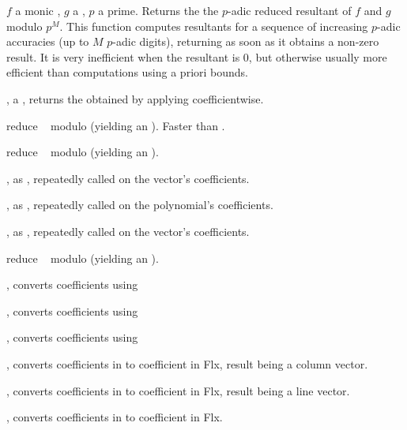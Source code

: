  $f$
a monic , $g$ a , $p$ a prime. Returns the
the $p$-adic reduced resultant of $f$ and $g$ modulo $p^M$. This function
computes resultants for a sequence of increasing $p$-adic accuracies
(up to $M$ $p$-adic digits), returning as soon as it obtains a non-zero
result. It is very inefficient when the resultant is $0$, but otherwise
usually more efficient than computations using a priori bounds.



,  a , returns the
 obtained by applying  coefficientwise.

 reduce ~ modulo 
(yielding an ). Faster than .

 reduce ~ modulo 
(yielding an ).

, as , repeatedly
called on the vector's coefficients.

, as ,
repeatedly called on the polynomial's coefficients.

, as ,
repeatedly called on the vector's coefficients.

 reduce ~ modulo 
(yielding an ).

, converts coefficients using 

, converts coefficients using 

, converts coefficients using 

, converts coefficients in 
to coefficient in Flx, result being a column vector.

, converts coefficients in 
to coefficient in Flx, result being a line vector.

, converts coefficients in 
to coefficient in Flx.

